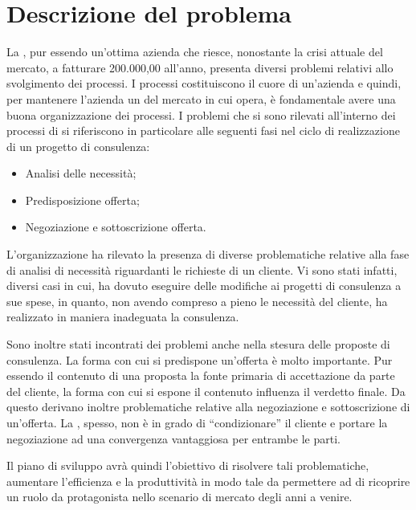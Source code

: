 

\section{Descrizione del problema}
La \customer , pur essendo un'ottima azienda che riesce, nonostante la crisi attuale del mercato, a fatturare  200.000,00 \text{\euro} all'anno, presenta diversi problemi relativi allo svolgimento dei processi.
I processi costituiscono il cuore di un'azienda e quindi, per mantenere l'azienda un  del mercato in cui opera, è fondamentale avere una buona organizzazione dei processi.
I problemi che si sono rilevati all'interno dei processi di \customer si riferiscono in particolare alle seguenti fasi nel ciclo di realizzazione di un progetto di consulenza:
\begin{itemize}
	\item Analisi delle necessità;
	\item Predisposizione offerta;
	\item Negoziazione e sottoscrizione offerta.
\end{itemize}

L'organizzazione ha rilevato la presenza di diverse problematiche relative alla fase di analisi di necessità riguardanti le richieste di un cliente. Vi sono stati infatti, diversi casi in cui, \customer  ha dovuto eseguire delle modifiche ai progetti di consulenza a sue spese, in quanto, non avendo compreso a pieno le necessità del cliente, ha  realizzato in maniera inadeguata la consulenza. 

Sono inoltre stati incontrati dei problemi anche nella stesura delle proposte di consulenza. La forma con cui si predispone un'offerta è molto importante. Pur essendo il contenuto di una proposta la fonte primaria di accettazione da parte del cliente, la forma con cui si espone il contenuto influenza il verdetto finale.
Da questo derivano inoltre problematiche relative alla negoziazione e sottoscrizione di un'offerta. La \customer , spesso, non è in grado di ``condizionare'' il cliente e portare la negoziazione ad una convergenza vantaggiosa per entrambe le parti.

Il piano di sviluppo avrà quindi l'obiettivo di risolvere tali problematiche, aumentare l'efficienza e la produttività in modo tale da permettere ad \customer di ricoprire un ruolo da protagonista nello scenario di mercato degli anni a venire.



